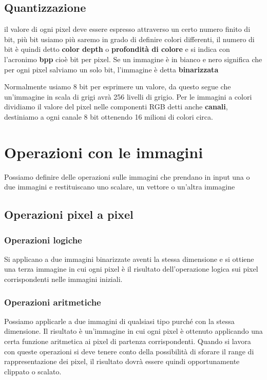 \subsection{Quantizzazione}
il valore di ogni pixel deve essere espresso attraverso un certo numero finito di bit, più bit usiamo più saremo in grado di definire colori differenti, il numero di bit è quindi detto \textbf{color depth} o \textbf{profondità di colore} e si indica con l'acronimo \textbf{bpp} cioè bit per pixel. Se un immagine è in bianco e nero significa che per ogni pixel salviamo un solo bit, l'immagine è detta \textbf{binarizzata}

Normalmente usiamo 8 bit per esprimere un valore, da questo segue che un'immagine in scala di grigi avrà 256 livelli di grigio. Per le immagini a colori dividiamo il valore del pixel nelle componenti RGB detti anche \textbf{canali}, destiniamo a ogni canale 8 bit ottenendo 16 milioni di colori circa.

\section{Operazioni con le immagini}
Possiamo definire delle operazioni sulle immagini che prendano in input una o due immagini e restituiscano uno scalare, un vettore o un'altra immagine
\subsection{Operazioni pixel a pixel}
\subsubsection{Operazioni logiche}
Si applicano a due immagini binarizzate aventi la stessa dimensione e si ottiene una terza immagine in cui ogni pixel è il risultato dell'operazione logica sui pixel corrispondenti nelle immagini iniziali.
\subsubsection{Operazioni aritmetiche}
Possiamo applicarle a due immagini di qualsiasi tipo purché con la stessa dimensione. Il risultato è un'immagine in cui ogni pixel è ottenuto applicando una certa funzione aritmetica ai pixel di partenza corrispondenti. Quando si lavora con queste operazioni si deve tenere conto della possibilità di sforare il range di rappresentazione dei pixel, il risultato dovrà essere quindi opportunamente clippato o scalato.
